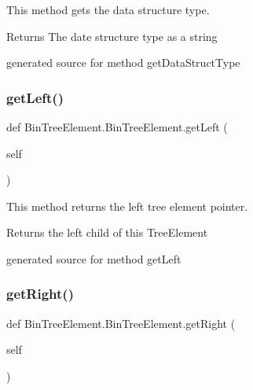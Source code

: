 This method gets the data structure type. 

\begin{DoxyReturn}{Returns}
The date structure type as a string\begin{DoxyVerb}generated source for method getDataStructType \end{DoxyVerb}
 
\end{DoxyReturn}
\hypertarget{class_bin_tree_element_1_1_bin_tree_element_a8515226277b5632baf3f0a57c0095fa6}{}\label{class_bin_tree_element_1_1_bin_tree_element_a8515226277b5632baf3f0a57c0095fa6} 
\subsubsection{\texorpdfstring{get\+Left()}{getLeft()}}
{\footnotesize\ttfamily def Bin\+Tree\+Element.\+Bin\+Tree\+Element.\+get\+Left (\begin{DoxyParamCaption}\item[{}]{self }\end{DoxyParamCaption})}



This method returns the left tree element pointer. 

\begin{DoxyReturn}{Returns}
the left child of this Tree\+Element\begin{DoxyVerb}generated source for method getLeft \end{DoxyVerb}
 
\end{DoxyReturn}
\hypertarget{class_bin_tree_element_1_1_bin_tree_element_a292647759d9bd7f705e6240afed1b707}{}\label{class_bin_tree_element_1_1_bin_tree_element_a292647759d9bd7f705e6240afed1b707} 
\subsubsection{\texorpdfstring{get\+Right()}{getRight()}}
{\footnotesize\ttfamily def Bin\+Tree\+Element.\+Bin\+Tree\+Element.\+get\+Right (\begin{DoxyParamCaption}\item[{}]{self }\end{DoxyParamCaption})}



